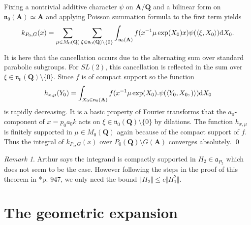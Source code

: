 \documentclass[11pt]{amsart}
\def\A{\mathbf A}
\def\Q{\mathbf Q}
\def\aaa{\mathfrak a}
\def\d{\text d}
\def\bs{\setminus}
\def\norm#1{\Vert #1 \Vert} %
\def\nnn{\mathfrak n}
\def\sprod#1#2{\left\langle #1 , #2 \right\rangle}  %
\theoremstyle{remark}
\newtheorem{remark}[theorem]{Remark}
\begin{document}
Fixing a nontrivial additive character $\psi$ on $\A/\Q$ and a bilinear form on $\nnn_0(\A) \simeq \A$ and applying Poisson summation formula to the first term yields
\[ k_{P_0, G}(x) = \sum_{\mu \in M_0(\Q)} \sum_{\xi \in \nnn_0(\Q) \bs \{0 \}} \int_{\nnn_0(\A)}
		f(x^{-1} \mu \exp(X_0) x) \psi(\sprod{\xi}{X_0}) \d X_0.
\]

It is here that the cancellation occurs due to the alternating sum over standard parabolic subgroups. For $SL(2)$, this cancellation is reflected in the sum over $\xi \in \nnn_0(\Q) \bs \{0\}$. Since $f$ is of compact support so the function
\[ h_{x, \mu}(Y_0) = \int_{X_0 \in \nnn_0(\A)} f(x^{-1} \mu \exp(X_0) . \psi(\sprod{Y_0, X_0})) \d X_0 \]
is rapidly decreasing. It is a basic property of Fourier transforms that the $a_0$-component of $x = p_0 a_0 k$ acts on $\xi \in \nnn_0(\Q) \bs \{0\}$ by dilations. The function $h_{x, \mu}$ is finitely supported in $\mu \in M_0(\Q)$ again because of the compact support of $f$. Thus the integral of $k_{P_0, G}(x)$ over $P_0(\Q)\bs G(\A)$ converges absolutely. \qed

\begin{remark}
	Arthur says the integrand is compactly supported in $H_2 \in \aaa_{P_2}$ which does not seem to be the case. However following the steps in the proof of this theorem in \cite{duke}*{p. 947}, we only need the bound $\norm{H_2} \leq c \norm{H_1^2}$. 
\end{remark}

\section{The geometric expansion} \label{sec:geom}
\end{document}
